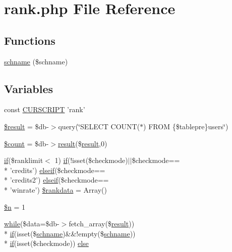 \hypertarget{rank_8php}{\section{rank.\+php File Reference}
\label{rank_8php}
}
\subsection*{Functions}
\begin{DoxyCompactItemize}
\item 
\hyperlink{rank_8php_a4e73cd0b572d53cc1f4b32111fbf5e04}{schname} (\$schname)
\end{DoxyCompactItemize}
\subsection*{Variables}
\begin{DoxyCompactItemize}
\item 
const \hyperlink{rank_8php_a39c39f525eceb86cabc338804f230e80}{C\+U\+R\+S\+C\+R\+I\+P\+T} 'rank'
\item 
\hyperlink{rank_8php_a112ef069ddc0454086e3d1e6d8d55d07}{\$result} = \$db-\/$>$query(\char`\"{}S\+E\+L\+E\+C\+T C\+O\+U\+N\+T($\ast$) F\+R\+O\+M \{\$tablepre\}users\char`\"{})
\item 
\hyperlink{rank_8php_af789423037bbc89dc7c850e761177570}{\$count} = \$db-\/$>$\hyperlink{templates_2install_8php_abdecde238169a1e34f68354fc9968af0}{result}(\$\hyperlink{templates_2install_8php_abdecde238169a1e34f68354fc9968af0}{result},0)
\item 
\hyperlink{login__old_8php_a4ac1118c2e44c513a674bc1793ba6c90}{if}(\$ranklimit$<$ 1) \hyperlink{login__old_8php_a4ac1118c2e44c513a674bc1793ba6c90}{if}(!isset(\$checkmode)$\vert$$\vert$\$checkmode== \\*
'credits') \hyperlink{urlist_8php_a77f52b43f81ed05a41b68c2161789055}{elseif}(\$checkmode== \\*
'credits2') \hyperlink{urlist_8php_a77f52b43f81ed05a41b68c2161789055}{elseif}(\$checkmode== \\*
'winrate') \hyperlink{rank_8php_a02401547b9013def6fe6ece773cd933a}{\$rankdata} = Array()
\item 
\hyperlink{rank_8php_aa5fae90470d460a65d5211ec08e6b05c}{\$n} = 1
\item 
\hyperlink{stat_8php_ab54633a8fada54bedd1fe3c2635cfaeb}{while}(\$data=\$db-\/$>$fetch\+\_\+array(\$\hyperlink{templates_2install_8php_abdecde238169a1e34f68354fc9968af0}{result})) \\*
\hyperlink{login__old_8php_a4ac1118c2e44c513a674bc1793ba6c90}{if}(isset(\$\hyperlink{rank_8php_a4e73cd0b572d53cc1f4b32111fbf5e04}{schname})\&\&!empty(\$\hyperlink{rank_8php_a4e73cd0b572d53cc1f4b32111fbf5e04}{schname})) \\*
\hyperlink{login__old_8php_a4ac1118c2e44c513a674bc1793ba6c90}{if}(isset(\$checkmode)) \hyperlink{rank_8php_a7bd00ad9e52e5687a0fc1335557e5670}{else}
\end{DoxyCompactItemize}


